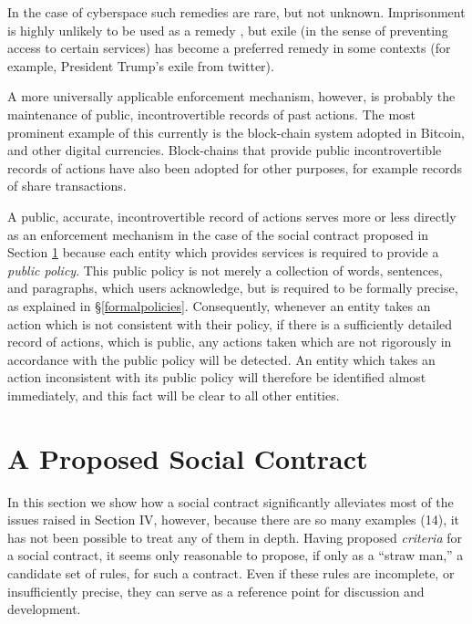 In the case of cyberspace such remedies are rare, but not unknown. Imprisonment is
highly unlikely to be used as a remedy     \cite{parameswaran2007social}, but exile (in the sense of preventing
access to certain services) has become a preferred remedy in some contexts (for example,
President Trump's exile from twitter).

A more universally applicable enforcement mechanism, however, is probably the
maintenance of public, incontrovertible records of past actions. The most prominent
example of this currently is the block-chain system adopted in Bitcoin, and 
other digital currencies. Block-chains that provide public incontrovertible
records of actions have also been adopted for other purposes, for example records
of share transactions.

A public, accurate, incontrovertible record of actions serves more or less directly
as an enforcement mechanism in the case of the social contract proposed in
Section \ref{proposedsc} because each entity which provides services is required
to provide a {\em public policy}. This public policy is not merely a collection
of words, sentences, and paragraphs, which users acknowledge, but is required
to be formally precise, as explained in \S\ref{formalpolicies}. Consequently, whenever
an entity takes an action which is not consistent with their policy, if there
is a sufficiently detailed record of actions, which is public, any actions taken
which are not rigorously in accordance with the public policy will be detected.
An entity which takes an action inconsistent with its public policy will therefore
be identified almost immediately, and this fact will be clear to all other entities.

\section{A Proposed Social Contract}\label{proposedsc}

In this section we show how a social contract significantly alleviates most of the issues raised in Section IV, however, because there are so many examples (14), it has not been possible to treat any of them in depth.
Having proposed {\em criteria} for a social contract, it seems only reasonable to
propose, if only as a ``straw man,'' a candidate set of rules, for such a contract.
Even if these rules are incomplete, or insufficiently precise, they can serve as
a reference point for discussion and development.



